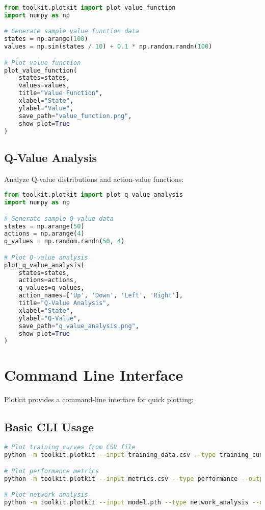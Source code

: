 \begin{lstlisting}[language=python, caption=Value Function Visualization]
from toolkit.plotkit import plot_value_function
import numpy as np

# Generate sample value function data
states = np.arange(100)
values = np.sin(states / 10) + 0.1 * np.random.randn(100)

# Plot value function
plot_value_function(
    states=states,
    values=values,
    title="Value Function",
    xlabel="State",
    ylabel="Value",
    save_path="value_function.png",
    show_plot=True
)
\end{lstlisting}

\subsection{Q-Value Analysis}

Analyze Q-value distributions and action-value functions:

\begin{lstlisting}[language=python, caption=Q-Value Analysis]
from toolkit.plotkit import plot_q_value_analysis
import numpy as np

# Generate sample Q-value data
states = np.arange(50)
actions = np.arange(4)
q_values = np.random.randn(50, 4)

# Plot Q-value analysis
plot_q_value_analysis(
    states=states,
    actions=actions,
    q_values=q_values,
    action_names=['Up', 'Down', 'Left', 'Right'],
    title="Q-Value Analysis",
    xlabel="State",
    ylabel="Q-Value",
    save_path="q_value_analysis.png",
    show_plot=True
)
\end{lstlisting}

\section{Command Line Interface}

Plotkit provides a command-line interface for quick plotting:

\subsection{Basic CLI Usage}

\begin{lstlisting}[language=bash, caption=Basic CLI Usage]
# Plot training curves from CSV file
python -m toolkit.plotkit --input training_data.csv --type training_curves --output training_plot.png

# Plot performance metrics
python -m toolkit.plotkit --input metrics.csv --type performance --output performance_plot.png

# Plot network analysis
python -m toolkit.plotkit --input model.pth --type network_analysis --output network_plot.png
\end{lstlisting}


